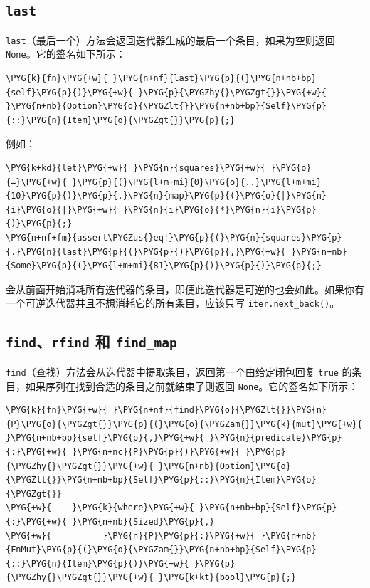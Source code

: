 \subsection{\texttt{last}}

\texttt{last}（最后一个）方法会返回迭代器生成的最后一个条目，如果为空则返回 \texttt{None}。它的签名如下所示：

\begin{Verbatim}[commandchars=\\\{\},breaklines=true,breakanywhere=true,fontsize=\codefont,xleftmargin=17bp]
\PYG{k}{fn}\PYG{+w}{ }\PYG{n+nf}{last}\PYG{p}{(}\PYG{n+nb+bp}{self}\PYG{p}{)}\PYG{+w}{ }\PYG{p}{\PYGZhy{}\PYGZgt{}}\PYG{+w}{ }\PYG{n+nb}{Option}\PYG{o}{\PYGZlt{}}\PYG{n+nb+bp}{Self}\PYG{p}{::}\PYG{n}{Item}\PYG{o}{\PYGZgt{}}\PYG{p}{;}
\end{Verbatim}

例如：

\begin{Verbatim}[commandchars=\\\{\},breaklines=true,breakanywhere=true,fontsize=\codefont,xleftmargin=17bp]
\PYG{k+kd}{let}\PYG{+w}{ }\PYG{n}{squares}\PYG{+w}{ }\PYG{o}{=}\PYG{+w}{ }\PYG{p}{(}\PYG{l+m+mi}{0}\PYG{o}{..}\PYG{l+m+mi}{10}\PYG{p}{)}\PYG{p}{.}\PYG{n}{map}\PYG{p}{(}\PYG{o}{|}\PYG{n}{i}\PYG{o}{|}\PYG{+w}{ }\PYG{n}{i}\PYG{o}{*}\PYG{n}{i}\PYG{p}{)}\PYG{p}{;}
\PYG{n+nf+fm}{assert\PYGZus{}eq!}\PYG{p}{(}\PYG{n}{squares}\PYG{p}{.}\PYG{n}{last}\PYG{p}{(}\PYG{p}{)}\PYG{p}{,}\PYG{+w}{ }\PYG{n+nb}{Some}\PYG{p}{(}\PYG{l+m+mi}{81}\PYG{p}{)}\PYG{p}{)}\PYG{p}{;}
\end{Verbatim}

会从前面开始消耗所有迭代器的条目，即便此迭代器是可逆的也会如此。如果你有一个可逆迭代器并且不想消耗它的所有条目，应该只写 \texttt{iter.next\_back()}。

\subsection{\texttt{find}、\texttt{rfind} 和 \texttt{find\_map}}

\texttt{find}（查找）方法会从迭代器中提取条目，返回第一个由给定闭包回复 \texttt{true} 的条目，如果序列在找到合适的条目之前就结束了则返回 \texttt{None}。它的签名如下所示：

\begin{Verbatim}[commandchars=\\\{\},breaklines=true,breakanywhere=true,fontsize=\codefont,xleftmargin=17bp]
\PYG{k}{fn}\PYG{+w}{ }\PYG{n+nf}{find}\PYG{o}{\PYGZlt{}}\PYG{n}{P}\PYG{o}{\PYGZgt{}}\PYG{p}{(}\PYG{o}{\PYGZam{}}\PYG{k}{mut}\PYG{+w}{ }\PYG{n+nb+bp}{self}\PYG{p}{,}\PYG{+w}{ }\PYG{n}{predicate}\PYG{p}{:}\PYG{+w}{ }\PYG{n+nc}{P}\PYG{p}{)}\PYG{+w}{ }\PYG{p}{\PYGZhy{}\PYGZgt{}}\PYG{+w}{ }\PYG{n+nb}{Option}\PYG{o}{\PYGZlt{}}\PYG{n+nb+bp}{Self}\PYG{p}{::}\PYG{n}{Item}\PYG{o}{\PYGZgt{}}
\PYG{+w}{    }\PYG{k}{where}\PYG{+w}{ }\PYG{n+nb+bp}{Self}\PYG{p}{:}\PYG{+w}{ }\PYG{n+nb}{Sized}\PYG{p}{,}
\PYG{+w}{          }\PYG{n}{P}\PYG{p}{:}\PYG{+w}{ }\PYG{n+nb}{FnMut}\PYG{p}{(}\PYG{o}{\PYGZam{}}\PYG{n+nb+bp}{Self}\PYG{p}{::}\PYG{n}{Item}\PYG{p}{)}\PYG{+w}{ }\PYG{p}{\PYGZhy{}\PYGZgt{}}\PYG{+w}{ }\PYG{k+kt}{bool}\PYG{p}{;}
\end{Verbatim}

